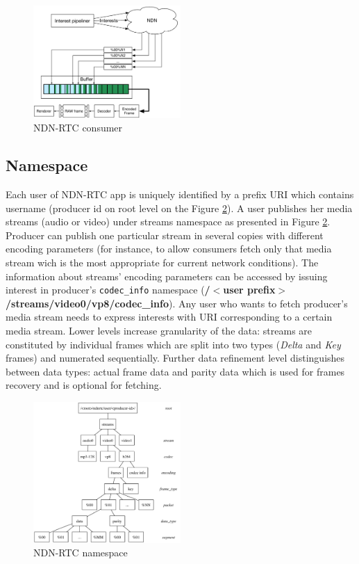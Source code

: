 \documentclass[10pt]{proc}
\begin{document}
\begin{figure}[Ht!]
\centering
\includegraphics[width=0.5\textwidth]{consumer}
\caption{NDN-RTC consumer}
\label{fig:consumer}
\end{figure}


\subsection{Namespace}

Each user of NDN-RTC app is uniquely identified by a prefix URI which contains username (producer id on root level on the Figure \ref{fig:namespace}). A user publishes her media streams (audio or video) under streams namespace as presented in Figure \ref{fig:namespace}. Producer can publish one particular stream in several copies with different encoding parameters (for instance, to allow consumers fetch only that media stream wich is the most appropriate for current network conditions). The information about streams' encoding parameters can be accessed by issuing interest in producer's \texttt{codec\_info} namespace (\textbf{/$<$user prefix$>$/streams/video0/vp8/codec\_info}).
Any user who wants to fetch producer's media stream needs to express interests with URI corresponding to a certain media stream. 
Lower levels increase granularity of the data: streams are constituted by individual frames which are split into two types (\textit{Delta} and \textit{Key} frames) and numerated sequentially. Further data refinement level distinguishes between data types: actual frame data and parity data which is used for frames recovery and is optional for fetching.

\begin{figure}[Ht!]
\centering
\includegraphics[width=0.5\textwidth]{namespace}
\caption{NDN-RTC namespace}
\label{fig:namespace}
\end{figure}
\end{document}
